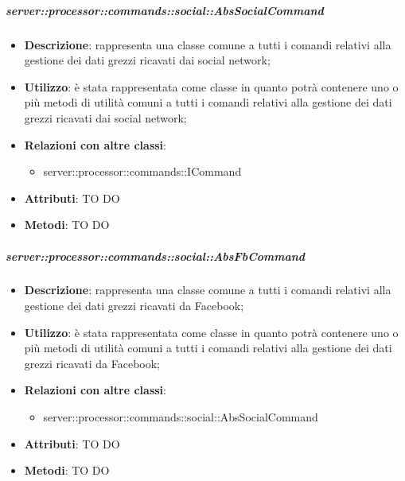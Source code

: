         \subparagraph{server::processor::commands::social::AbsSocialCommand} %
        \label{subp:bdsm_app_server_processor_commands_social_abssocialcommand}
        \begin{itemize}
          \item \textbf{Descrizione}: rappresenta una classe comune a tutti i comandi relativi alla gestione dei dati grezzi ricavati dai social network;
          \item \textbf{Utilizzo}: è stata rappresentata come classe in quanto potrà contenere uno o più metodi di utilità comuni a tutti i comandi relativi alla gestione dei dati grezzi ricavati dai social network;
          \item \textbf{Relazioni con altre classi}:
            \begin{itemize}
              \item server::processor::commands::ICommand
            \end{itemize}
			\item \textbf{Attributi}: TO DO
			\item \textbf{Metodi}: TO DO
        \end{itemize}


        \subparagraph{server::processor::commands::social::AbsFbCommand} %
        \label{subp:bdsm_app_server_processor_commands_social_absfbcommand}
        \begin{itemize}
          \item \textbf{Descrizione}: rappresenta una classe comune a tutti i comandi relativi alla gestione dei dati grezzi ricavati da Facebook;
          \item \textbf{Utilizzo}: è stata rappresentata come classe in quanto potrà contenere uno o più metodi di utilità comuni a tutti i comandi relativi alla gestione dei dati grezzi ricavati da Facebook;
          \item \textbf{Relazioni con altre classi}:
            \begin{itemize}
              \item server::processor::commands::social::AbsSocialCommand
            \end{itemize}
			\item \textbf{Attributi}: TO DO
			\item \textbf{Metodi}: TO DO
        \end{itemize}

